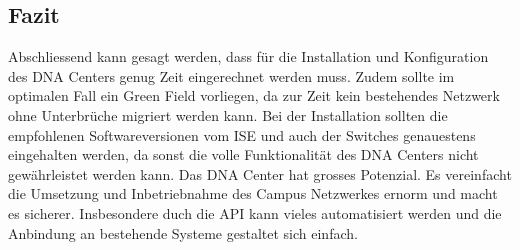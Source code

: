\subsection{Fazit}
Abschliessend kann gesagt werden, dass für die Installation und Konfiguration des DNA Centers genug Zeit eingerechnet werden muss. Zudem sollte im optimalen Fall ein Green Field vorliegen, da zur Zeit kein bestehendes Netzwerk ohne Unterbrüche migriert werden kann. Bei der Installation sollten die empfohlenen Softwareversionen vom ISE und auch der Switches genauestens eingehalten werden, da sonst die volle Funktionalität des DNA Centers nicht gewährleistet werden kann. Das DNA Center hat grosses Potenzial. Es vereinfacht die Umsetzung und Inbetriebnahme des Campus Netzwerkes ernorm und macht es sicherer. Insbesondere duch die API kann vieles automatisiert werden und die Anbindung an bestehende Systeme gestaltet sich einfach.